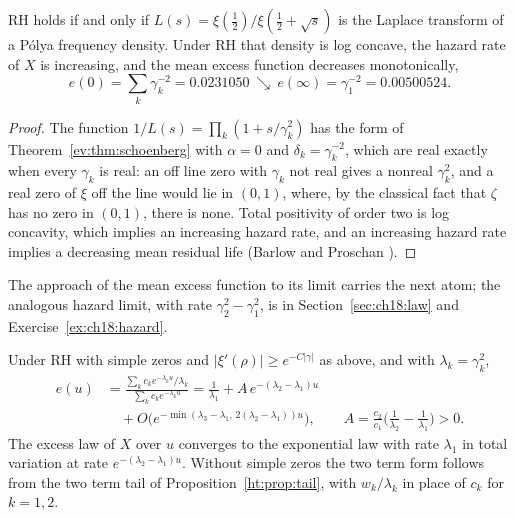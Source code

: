 \begin{corollary}\label{ev:cor:pf}
RH holds if and only if $L(s)=\xi(\frac12)/\xi(\frac12+\sqrt s)$ is the Laplace transform of a P\'olya frequency density. Under RH that density is log concave, the hazard rate of $X$ is increasing, and the mean excess function decreases monotonically,
\[
e(0)=\sum_k\gamma_k^{-2}=0.0231050\ \searrow\ e(\infty)=\gamma_1^{-2}=0.00500524 .
\]
\end{corollary}

\begin{proof}
The function $1/L(s)=\prod_k(1+s/\gamma_k^2)$ has the form of Theorem~\ref{ev:thm:schoenberg} with $\alpha=0$ and $\delta_k=\gamma_k^{-2}$, which are real exactly when every $\gamma_k$ is real: an off line zero with $\gamma_k$ not real gives a nonreal $\gamma_k^2$, and a real zero of $\xi$ off the line would lie in $(0,1)$, where, by the classical fact that $\zeta$ has no zero in $(0,1)$, there is none. Total positivity of order two is log concavity, which implies an increasing hazard rate, and an increasing hazard rate implies a decreasing mean residual life (Barlow and Proschan \cite{BarlowProschan75}). %
\end{proof}

The approach of the mean excess function to its limit carries the next atom; the analogous hazard limit, with rate $\gamma_2^2-\gamma_1^2$, is in Section~\ref{sec:ch18:law} and Exercise~\ref{ex:ch18:hazard}.

\begin{proposition}\label{ev:prop:meexp}
Under RH with simple zeros and $|\xi'(\rho)|\ge e^{-C|\gamma|}$ as above, and with $\lambda_k=\gamma_k^2$,
\[
\begin{aligned}e(u)&=\frac{\sum_kc_ke^{-\lambda_ku}/\lambda_k}{\sum_kc_ke^{-\lambda_ku}}=\frac1{\lambda_1}+A\,e^{-(\lambda_2-\lambda_1)u}\\&\quad+O\big(e^{-\min(\lambda_3-\lambda_1,\,2(\lambda_2-\lambda_1))u}\big),\qquad A=\frac{c_2}{c_1}\Big(\frac1{\lambda_2}-\frac1{\lambda_1}\Big)>0 .\end{aligned}
\]
The excess law of $X$ over $u$ converges to the exponential law with rate $\lambda_1$ in total variation at rate $e^{-(\lambda_2-\lambda_1)u}$. Without simple zeros the two term form follows from the two term tail of Proposition~\ref{ht:prop:tail}, with $w_k/\lambda_k$ in place of $c_k$ for $k=1,2$.
\end{proposition}

